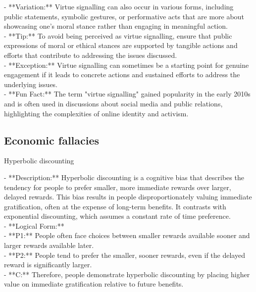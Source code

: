 \documentclass[a4paper,12pt,single,pdftex]{scrbook}
\begin{document}
    
      - **Variation:** Virtue signalling can also occur in various forms, including public statements, symbolic gestures, or performative acts that are more about showcasing one’s moral stance rather than engaging in meaningful action.
    \\

    
      - **Tip:** To avoid being perceived as virtue signalling, ensure that public expressions of moral or ethical stances are supported by tangible actions and efforts that contribute to addressing the issues discussed.
    \\

    
      - **Exception:** Virtue signalling can sometimes be a starting point for genuine engagement if it leads to concrete actions and sustained efforts to address the underlying issues.
    \\

    
      - **Fun Fact:** The term "virtue signalling" gained popularity in the early 2010s and is often used in discussions about social media and public relations, highlighting the complexities of online identity and activism.
    \\

  \subsection{Economic fallacies}


Hyperbolic discounting
    
      - **Description:** Hyperbolic discounting is a cognitive bias that describes the tendency for people to prefer smaller, more immediate rewards over larger, delayed rewards. This bias results in people disproportionately valuing immediate gratification, often at the expense of long-term benefits. It contrasts with exponential discounting, which assumes a constant rate of time preference.
    \\

    
      - **Logical Form:**
    \\

    
        - **P1:** People often face choices between smaller rewards available sooner and larger rewards available later.
    \\

    
        - **P2:** People tend to prefer the smaller, sooner rewards, even if the delayed reward is significantly larger.
    \\

    
        - **C:** Therefore, people demonstrate hyperbolic discounting by placing higher value on immediate gratification relative to future benefits.
    \\
\end{document}
